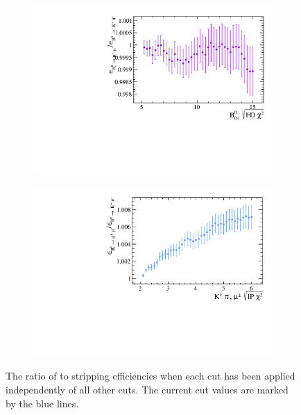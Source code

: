 \begin{figure}
    \begin{subfigure}[b]{0.4\textwidth}
        \includegraphics[width=\textwidth]{./Figs/Selection/Bs2MuMu_KPi_FD.pdf}
        \caption{ }
        \label{fig:FD_ratioKPi}
    \end{subfigure}
   \begin{subfigure}[b]{0.4\textwidth}
        \includegraphics[width=\textwidth]{./Figs/Selection/Bs2MuMu_KPi_daughter_IP.pdf}
        \caption{ }
        \label{fig:IPS_ratioKPi}
    \end{subfigure}
    \caption{The ratio of \bsmumu to \bdkpi stripping efficiencies when each cut has been applied independently of all other cuts. The current cut values are marked by the blue lines.}
    \label{fig:ratio_plotsBd2KPi}
\end{figure}


